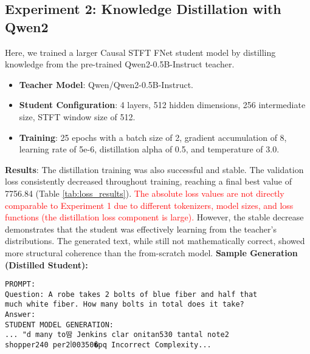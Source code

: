 \documentclass[11pt,a4paper]{article}
\begin{document}
\subsection{Experiment 2: Knowledge Distillation with Qwen2}
Here, we trained a larger Causal STFT FNet student model by distilling knowledge from the pre-trained Qwen2-0.5B-Instruct teacher.
\begin{itemize}
\item \textbf{Teacher Model}: Qwen/Qwen2-0.5B-Instruct.
\item \textbf{Student Configuration}: 4 layers, 512 hidden dimensions, 256 intermediate size, STFT window size of 512.
\item \textbf{Training}: 25 epochs with a batch size of 2, gradient accumulation of 8, learning rate of 5e-6, distillation alpha of 0.5, and temperature of 3.0.
\end{itemize}
\textbf{Results}: The distillation training was also successful and stable. The validation loss consistently decreased throughout training, reaching a final best value of 7756.84 (Table \ref{tab:loss_results}). \textcolor{red}{The absolute loss values are not directly comparable to Experiment 1 due to different tokenizers, model sizes, and loss functions (the distillation loss component is large).} However, the stable decrease demonstrates that the student was effectively learning from the teacher's distributions. The generated text, while still not mathematically correct, showed more structural coherence than the from-scratch model.
\textbf{Sample Generation (Distilled Student):}
\begin{verbatim}
PROMPT:
Question: A robe takes 2 bolts of blue fiber and half that
much white fiber. How many bolts in total does it take?
Answer:
STUDENT MODEL GENERATION:
... "d many to땀 Jenkins clar onitan530 tantal note2
shopper240 per2ᥣ00350�pq Incorrect Complexity...
\end{verbatim}
\end{document}

